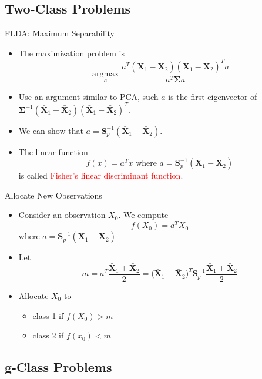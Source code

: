 \documentclass[
  ignorenonframetext,
]{beamer}
\providecommand{\tightlist}{%
  \setlength{\itemsep}{0pt}\setlength{\parskip}{0pt}}
\begin{document}
\hypertarget{two-class-problems}{%
\subsection{Two-Class Problems}\label{two-class-problems}}

\begin{frame}{FLDA: Maximum Separability}
\protect\hypertarget{flda-maximum-separability}{}
\begin{itemize}
\item
  The maximization problem is
  \[\operatorname*{argmax}_a \frac{a^T(\bar {\mathbf X}_1 - \bar {\mathbf X}_2)(\bar {\mathbf X}_1 - \bar {\mathbf X}_2)^Ta}{a^T \boldsymbol \Sigma a}\]
\item
  Use an argument similar to PCA, such \(a\) is the first eigenvector of
  \(\boldsymbol \Sigma ^{-1}(\bar {\mathbf X}_1 - \bar {\mathbf X}_2)(\bar {\mathbf X}_1 - \bar {\mathbf X}_2)^T\).
\item
  We can show that
  \(a=\mathbf S_p^{-1}(\bar {\mathbf X}_1 - \bar {\mathbf X}_2)\).
\item
  The linear function
  \[f(x)=a^T x \mbox{ where } a=\mathbf  S_p^{-1}(\bar {\mathbf X}_1 - \bar {\mathbf X}_2)\]
  is called \textcolor{red}{Fisher's linear discriminant function}.
\end{itemize}
\end{frame}

\begin{frame}{Allocate New Observations}
\protect\hypertarget{allocate-new-observations}{}
\begin{itemize}
\item
  Consider an observation \(X_0\). We compute \[f(X_0)=a^T X_0\] where
  \(a=\mathbf S_p^{-1}(\bar {\mathbf X}_1 - \bar {\mathbf X}_2)\)
\item
  Let
  \[m=a^T \frac{\bar {\mathbf X}_1 + \bar {\mathbf X}_2}{2}=\boldsymbol (\bar {\mathbf X}_1 - \bar {\mathbf X}_2)^T \mathbf  S_p^{-1}\frac{\bar {\mathbf X}_1 + \bar {\mathbf X}_2}{2}\]
\item
  Allocate \(X_0\) to

  \begin{itemize}
  \tightlist
  \item
    class 1 if \(f(X_0)>m\)
  \item
    class 2 if \(f(x_0)<m\)
  \end{itemize}
\end{itemize}
\end{frame}

\hypertarget{g-class-problems}{%
\subsection{g-Class Problems}\label{g-class-problems}}
\end{document}
